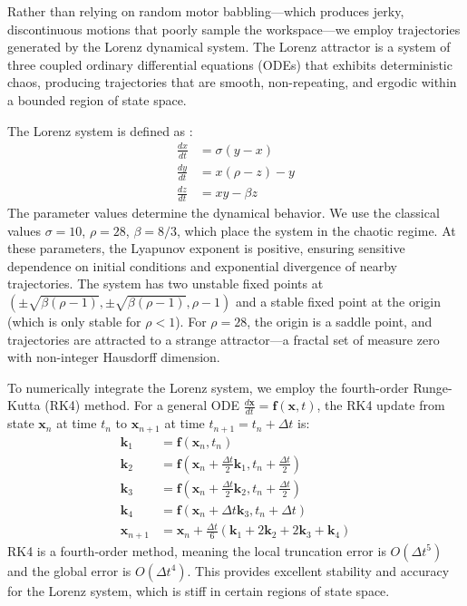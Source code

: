 \documentclass[12pt,a4paper,oneside]{report}
\begin{document}
Rather than relying on random motor babbling---which produces jerky, discontinuous motions that poorly sample the workspace---we employ trajectories generated by the Lorenz dynamical system. The Lorenz attractor is a system of three coupled ordinary differential equations (ODEs) that exhibits deterministic chaos, producing trajectories that are smooth, non-repeating, and ergodic within a bounded region of state space.

The Lorenz system is defined as \cite{lorenz1963}:
\begin{align}
\frac{dx}{dt} &= \sigma(y - x) \\
\frac{dy}{dt} &= x(\rho - z) - y \\
\frac{dz}{dt} &= xy - \beta z
\end{align}
The parameter values determine the dynamical behavior. We use the classical values $\sigma = 10$, $\rho = 28$, $\beta = 8/3$, which place the system in the chaotic regime. At these parameters, the Lyapunov exponent is positive, ensuring sensitive dependence on initial conditions and exponential divergence of nearby trajectories. The system has two unstable fixed points at $(\pm\sqrt{\beta(\rho-1)}, \pm\sqrt{\beta(\rho-1)}, \rho-1)$ and a stable fixed point at the origin (which is only stable for $\rho < 1$). For $\rho = 28$, the origin is a saddle point, and trajectories are attracted to a strange attractor---a fractal set of measure zero with non-integer Hausdorff dimension.

To numerically integrate the Lorenz system, we employ the fourth-order Runge-Kutta (RK4) method. For a general ODE $\frac{d\mathbf{x}}{dt} = \mathbf{f}(\mathbf{x}, t)$, the RK4 update from state $\mathbf{x}_n$ at time $t_n$ to $\mathbf{x}_{n+1}$ at time $t_{n+1} = t_n + \Delta t$ is:
\begin{align}
\mathbf{k}_1 &= \mathbf{f}(\mathbf{x}_n, t_n) \\
\mathbf{k}_2 &= \mathbf{f}(\mathbf{x}_n + \frac{\Delta t}{2}\mathbf{k}_1, t_n + \frac{\Delta t}{2}) \\
\mathbf{k}_3 &= \mathbf{f}(\mathbf{x}_n + \frac{\Delta t}{2}\mathbf{k}_2, t_n + \frac{\Delta t}{2}) \\
\mathbf{k}_4 &= \mathbf{f}(\mathbf{x}_n + \Delta t \mathbf{k}_3, t_n + \Delta t) \\
\mathbf{x}_{n+1} &= \mathbf{x}_n + \frac{\Delta t}{6}(\mathbf{k}_1 + 2\mathbf{k}_2 + 2\mathbf{k}_3 + \mathbf{k}_4)
\end{align}
RK4 is a fourth-order method, meaning the local truncation error is $O(\Delta t^5)$ and the global error is $O(\Delta t^4)$. This provides excellent stability and accuracy for the Lorenz system, which is stiff in certain regions of state space.
\end{document}
